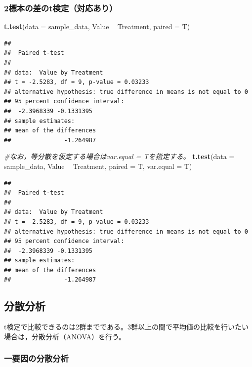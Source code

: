 \documentclass[]{article}
\newenvironment{Shaded}{\begin{snugshade}}{\end{snugshade}}
\newcommand{\KeywordTok}[1]{\textcolor[rgb]{0.13,0.29,0.53}{\textbf{#1}}}
\newcommand{\DataTypeTok}[1]{\textcolor[rgb]{0.13,0.29,0.53}{#1}}
\newcommand{\StringTok}[1]{\textcolor[rgb]{0.31,0.60,0.02}{#1}}
\newcommand{\CommentTok}[1]{\textcolor[rgb]{0.56,0.35,0.01}{\textit{#1}}}
\newcommand{\OperatorTok}[1]{\textcolor[rgb]{0.81,0.36,0.00}{\textbf{#1}}}
\newcommand{\NormalTok}[1]{#1}
\begin{document}
\subsubsection{2標本の差のt検定（対応あり）}\label{t}

\begin{Shaded}
\begin{Highlighting}[]
\KeywordTok{t.test}\NormalTok{(}\DataTypeTok{data =}\NormalTok{ sample_data, Value }\OperatorTok{~}\StringTok{ }\NormalTok{Treatment, }\DataTypeTok{paired =}\NormalTok{ T)}
\end{Highlighting}
\end{Shaded}

\begin{verbatim}
## 
##  Paired t-test
## 
## data:  Value by Treatment
## t = -2.5283, df = 9, p-value = 0.03233
## alternative hypothesis: true difference in means is not equal to 0
## 95 percent confidence interval:
##  -2.3968339 -0.1331395
## sample estimates:
## mean of the differences 
##               -1.264987
\end{verbatim}

\begin{Shaded}
\begin{Highlighting}[]
\CommentTok{#なお，等分散を仮定する場合はvar.equal = Tを指定する。}
\KeywordTok{t.test}\NormalTok{(}\DataTypeTok{data =}\NormalTok{ sample_data, Value }\OperatorTok{~}\StringTok{ }\NormalTok{Treatment, }\DataTypeTok{paired =}\NormalTok{ T, }\DataTypeTok{var.equal =}\NormalTok{ T)}
\end{Highlighting}
\end{Shaded}

\begin{verbatim}
## 
##  Paired t-test
## 
## data:  Value by Treatment
## t = -2.5283, df = 9, p-value = 0.03233
## alternative hypothesis: true difference in means is not equal to 0
## 95 percent confidence interval:
##  -2.3968339 -0.1331395
## sample estimates:
## mean of the differences 
##               -1.264987
\end{verbatim}

\subsection{分散分析}

t検定で比較できるのは2群までである。3群以上の間で平均値の比較を行いたい場合は，分散分析（ANOVA）を行う。

\subsubsection{一要因の分散分析}
\end{document}
